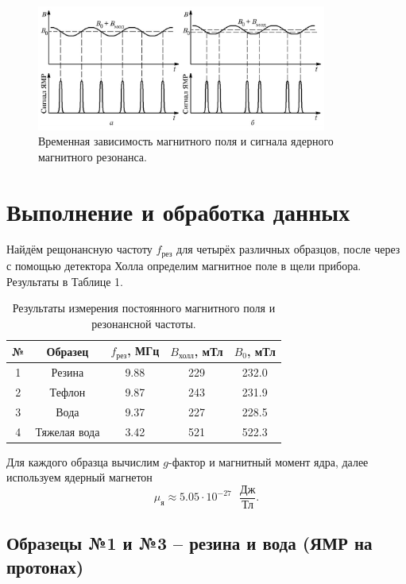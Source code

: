 \documentclass[a4paper,12pt]{article}
\theoremstyle{definition}
\begin{document}
\begin{figure}[h]
\includegraphics[width=0.85\textwidth]{2}
\centering
\caption{Временная зависимость магнитного поля и сигнала ядерного магнитного резонанса.}
\end{figure}
\section{Выполнение и обработка данных}
Найдём рещонансную частоту $f_{\text{рез}}$ для четырёх различных образцов, после через с помощью детектора Холла определим магнитное поле в щели прибора. Результаты в Таблице 1.
\begin{table}[h!]
\begin{tabular}{|c|c|c|c|c|}
\hline
№ & Образец      & $f_{\text{рез}}$,   МГц & $B_{\text{холл}}$,   мТл & $B_0$, мТл \\ \hline
1 & Резина       & 9.88                        & 229                         & 232.0           \\ \hline
2 & Тефлон       & 9.87                        & 243                         & 231.9           \\ \hline
3 & Вода         & 9.37                        & 227                         & 228.5           \\ \hline
4 & Тяжелая вода & 3.42                        & 521                         & 522.3           \\ \hline
\end{tabular}
\centering
\caption{Результаты измерения постоянного магнитного поля и резонансной частоты.}
\end{table}

Для каждого образца вычислим $g$-фактор и магнитный момент ядра, далее используем ядерный магнетон
$$
\mu_{\text{я}} \approx 5.05 \cdot 10^{-27} \text{ } \frac{\text{Дж}}{\text{Тл}}.
$$

\subsection{Образецы №1 и №3 -- резина и вода (ЯМР на протонах)}
\end{document}
